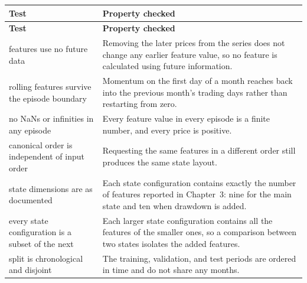 
\begin{longtable}{@{}p{}p{}@{}}
\toprule
\textbf{Test} & \textbf{Property checked} \\
\midrule
\endfirsthead
\toprule
\textbf{Test} & \textbf{Property checked} \\
\midrule
\endhead
\bottomrule
\endlastfoot
features use no future data & Removing the later prices from the series
  does not change any earlier feature value, so no feature is calculated
  using future information. \\
\rowsep
rolling features survive the episode boundary & Momentum on the first
  day of a month reaches back into the previous month's trading days
  rather than restarting from zero. \\
\rowsep
no NaNs or infinities in any episode & Every feature value in every
  episode is a finite number, and every price is positive. \\
\rowsep
canonical order is independent of input order & Requesting the same
  features in a different order still produces the same state layout. \\
\rowsep
state dimensions are as documented & Each state configuration contains
  exactly the number of features reported in Chapter~3: nine for the
  main state and ten when drawdown is added. \\
\rowsep
every state configuration is a subset of the next & Each larger state
  configuration contains all the features of the smaller ones, so a
  comparison between two states isolates the added features. \\
\rowsep
split is chronological and disjoint & The training, validation, and test
  periods are ordered in time and do not share any months. \\
\end{longtable}



